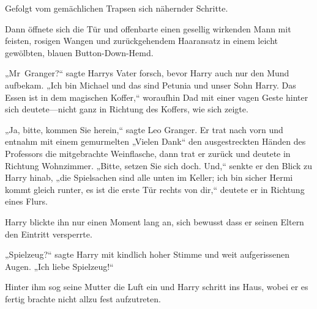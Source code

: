 Gefolgt vom gemächlichen Trapsen sich nähernder Schritte.

Dann öffnete sich die Tür und offenbarte einen gesellig wirkenden Mann mit feisten, rosigen Wangen und zurückgehendem Haaransatz in einem leicht gewölbten, blauen Button-Down-Hemd.

„Mr~Granger?“ sagte Harrys Vater forsch, bevor Harry auch nur den Mund aufbekam. „Ich bin Michael und das sind Petunia und unser Sohn Harry. Das Essen ist in dem magischen Koffer,“ woraufhin Dad mit einer vagen Geste hinter sich deutete—nicht ganz in Richtung des Koffers, wie sich zeigte.

„Ja, bitte, kommen Sie herein,“ sagte Leo Granger. Er trat nach vorn und entnahm mit einem gemurmelten „Vielen Dank“ den ausgestreckten Händen des Professors die mitgebrachte Weinflasche, dann trat er zurück und deutete in Richtung Wohnzimmer. „Bitte, setzen Sie sich doch. Und,“ senkte er den Blick zu Harry hinab, „die Spielsachen sind alle unten im Keller; ich bin sicher Hermi kommt gleich runter, es ist die erste Tür rechts von dir,“ deutete er in Richtung eines Flurs.

Harry blickte ihn nur einen Moment lang an, sich bewusst dass er seinen Eltern den Eintritt versperrte.

„Spielzeug?“ sagte Harry mit kindlich hoher Stimme und weit aufgerissenen Augen. „Ich liebe Spielzeug!“

Hinter ihm sog seine Mutter die Luft ein und Harry schritt ins Haus, wobei er es fertig brachte nicht allzu fest aufzutreten.

